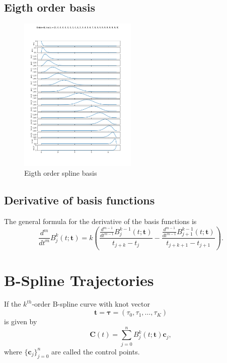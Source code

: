 \documentclass{article}
\begin{document}
\subsection{Eigth order basis}

\begin{figure}[hbt]
  \centering\includegraphics[width=0.5\textwidth]{./figures/spline_basis_8}
  \caption{Eigth order spline basis}
  \label{fig:spline_basis_8}  
\end{figure}


\subsection{Derivative of basis functions}


The general formula for the derivative of the basis functions is~\cite{PieglTiller95}
\[
\frac{d^m}{dt^m}B_j^k(t; \mathbf{t}) = k\left(\frac{\frac{d^{m-1}}{dt^{m-1}}B_j^{k-1}(t; \mathbf{t})}{t_{j+k}-t_j} - \frac{\frac{d^{m-1}}{dt^{m-1}}B_{j+1}^{k-1}(t; \mathbf{t})}{t_{j+k+1}-t_{j+1}} \right).
\]


\section{B-Spline Trajectories}

If the $k^{th}$-order B-spline curve with knot vector 
\[
\mathbf{t} = \boldsymbol{\tau} = (\tau_0, \tau_1, \dots, \tau_K)
\] 
is given by
\[
\mathbf{C}(t) = \sum_{j=0}^n B_j^k(t;\mathbf{t}) \mathbf{c}_j, 
\]
where $\{\mathbf{c}_j\}_{j=0}^n$ are called the control points.  
\end{document}
